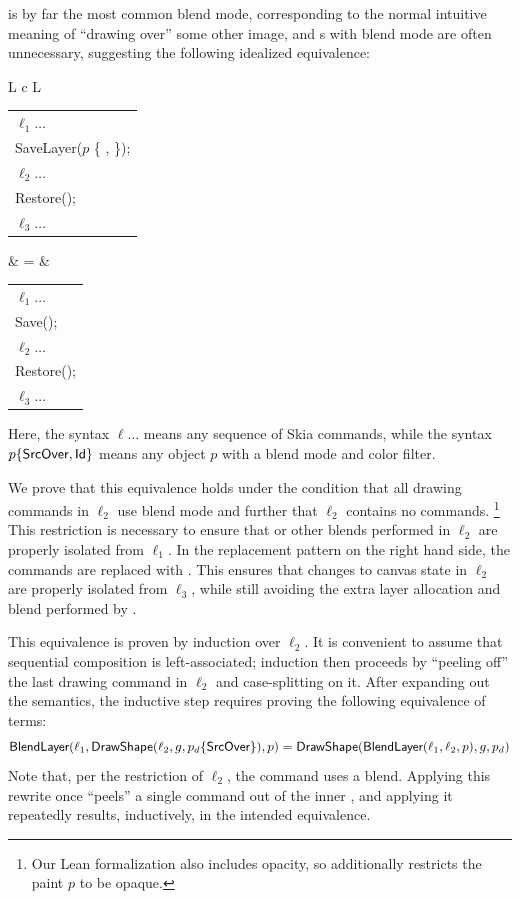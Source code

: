 \documentclass[main.tex]{subfiles}
\begin{document}
\SrcOver is by far the most common blend mode,
  corresponding to the normal intuitive meaning of
  ``drawing over'' some other image,
  and \SaveLayer{}s with \SrcOver blend mode
  are often unnecessary,
  suggesting the following idealized equivalence:
\begin{center}
  \begin{tabular}{L c L}
    \begin{tabular}{@{}l@{}}
      $\ell_1\ldots$ \\
      SaveLayer($p$ \{ \SrcOver, \Id \}); \\
      \quad $\ell_2\ldots$ \\
      Restore(); \\
      $\ell_3\ldots$
    \end{tabular}
    & = &
    \begin{tabular}{@{}l@{}}
      $\ell_1\ldots$ \\
      Save(); \\
      \quad $\ell_2\ldots$ \\
      Restore(); \\
      $\ell_3\ldots$
    \end{tabular}
  \end{tabular}
\end{center}
\noindent
Here, the syntax $\ell \ldots$ means
  any sequence of Skia commands,
  while the syntax $p \{ \textsf{SrcOver}, \textsf{Id} \}$ means
  any \Paint object $p$ with a \SrcOver blend mode
  and \Id color filter.

We prove that this equivalence holds under the condition
  that all drawing commands in $\ell_2$ use \SrcOver blend mode
  and further that $\ell_2$ contains no \SaveLayer commands.%
\footnote{
Our Lean formalization also includes opacity,
  so additionally restricts the paint $p$ to be opaque.
}
This restriction is necessary to ensure
  that \DstIn or other blends performed in $\ell_2$
  are properly isolated from $\ell_1$.
In the replacement pattern on the right hand side,
  the \SaveLayer commands are replaced with \Save.
This ensures that changes to canvas state in $\ell_2$
  are properly isolated from $\ell_3$,
  while still avoiding the extra layer allocation and blend
  performed by \SaveLayer.

This equivalence is proven by induction over $\ell_2$.
It is convenient to assume
  that sequential composition is left-associated;
  induction then proceeds by ``peeling off''
  the last drawing command in $\ell_2$
  and case-splitting on it.
After expanding out the \muskia semantics,
  the inductive step requires proving
  the following equivalence of \Layer terms:
  \[
      \textsf{BlendLayer}(\ell_1, \textsf{DrawShape}(\ell_2, g, p_d \{ \textsf{SrcOver} \}), p)
      =
      \textsf{DrawShape}(\textsf{BlendLayer}(\ell_1, \ell_2, p), g, p_d)
  \]
Note that, per the restriction of $\ell_2$,
  the \Draw command uses a \SrcOver blend.
Applying this rewrite once ``peels'' a single \Draw command
  out of the inner \SaveLayer,
  and applying it repeatedly results, inductively,
  in the intended equivalence.
\end{document}
